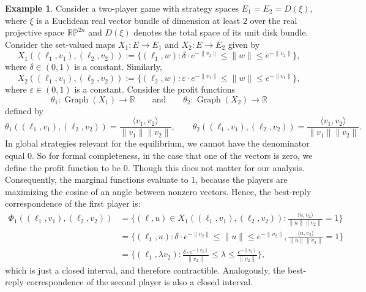 \documentclass[a4paper,11pt,reqno,english]{amsart}
\theoremstyle{definition}
\newtheorem{example}[theorem]{Example}
\begin{document}
\begin{example}
	Consider a two-player game with strategy spaces $E_1 = E_2 = D(\xi)$, where $\xi$ is a Euclidean real vector bundle of dimension at least $2$ over the real projective space $\mathbb{R}\mathbb{P}^{2n}$ and $D(\xi)$ denotes the total space of its unit disk bundle. Consider the set-valued maps $X_1\colon E\longrightarrow E_1$ and $X_2\colon E\longrightarrow E_2$ given by
	\begin{displaymath}
		X_1((\ell_1, v_1), (\ell_2, v_2)) :=  \{ (\ell_1, w) : \delta \cdot e^{-\lVert v_2 \rVert} \leq \lVert w \rVert \leq e^{-\lVert v_2 \rVert}\},
	\end{displaymath}
	where $\delta\in(0, 1)$ is a constant. Similarly,
	\begin{displaymath}
		X_2((\ell_1, v_1), (\ell_2, v_2)) := \{ (\ell_2, w) : \varepsilon \cdot e^{-\lVert v_1 \rVert} \leq \lVert w \rVert \leq e^{-\lVert v_1 \rVert}\},
	\end{displaymath}
	where $\varepsilon\in(0, 1)$ is a constant. Consider the profit functions
	\begin{displaymath}
		\theta_1\colon \operatorname{Graph}(X_1) \longrightarrow\mathbb{R} \qquad \text{and} \qquad \theta_2\colon \operatorname{Graph}(X_2) \longrightarrow\mathbb{R}
	\end{displaymath}
	defined by
	\begin{displaymath}
		\theta_1((\ell_1, v_1), (\ell_2, v_2))  = \frac{\langle v_1, v_2 \rangle}{\lVert v_1\rVert\lVert v_2 \rVert}, \qquad
		\theta_2((\ell_1, v_1), (\ell_2, v_2))  = \frac{\langle v_1, v_2 \rangle}{\lVert v_1\rVert\lVert v_2 \rVert}.
	\end{displaymath}
	In global strategies relevant for the equilibrium, we cannot have the denominator equal $0$. So for formal completeness, in the case that one of the vectors is zero, we define the profit function to be $0$. Though this does not matter for our analysis.
	Consequently, the marginal functions evaluate to $1$, because the players are maximizing the cosine of an angle between nonzero vectors. Hence, the best-reply correspondence of the first player is:
	\begin{align*}
		\Phi_1((\ell_1, v_1), (\ell_2, v_2)) & = \Big\{(\ell, u) \in X_1((\ell_1, v_1), (\ell_2, v_2)) : \frac{\langle u, v_2 \rangle}{\lVert u\rVert\lVert v_2 \rVert} = 1 \Big\}                                                   \\
		                                     & = \Big\{(\ell_1, u) : \delta \cdot e^{-\lVert v_2 \rVert} \leq \lVert u \rVert \leq e^{-\lVert v_2 \rVert}, \frac{\langle u, v_2 \rangle}{\lVert u\rVert\lVert v_2 \rVert} = 1 \Big\} \\
		                                     & = \Big\{(\ell_1, \lambda v_2) : \frac{\delta \cdot e^{-\lVert v_2 \rVert}}{\lVert v_2\rVert} \leq \lambda \leq \frac{e^{-\lVert v_2 \rVert}}{\lVert v_2\rVert}  \Big\},
	\end{align*}
	which is just a closed interval, and therefore contractible. Analogously, the best-reply correspondence of the second player is also a closed interval.


\end{example}
\end{document}
